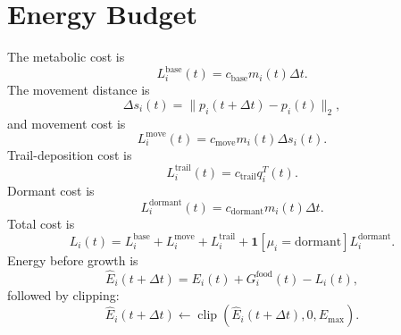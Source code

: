 \documentclass[11pt]{article}
\begin{document}
\section{Energy Budget}
The metabolic cost is
\begin{equation}
  L_i^{\mathrm{base}}(t)=c_{\mathrm{base}}m_i(t)\Delta t.
\end{equation}
The movement distance is
\begin{equation}
  \Delta s_i(t)=\|p_i(t+\Delta t)-p_i(t)\|_2,
\end{equation}
and movement cost is
\begin{equation}
  L_i^{\mathrm{move}}(t)=c_{\mathrm{move}}m_i(t)\Delta s_i(t).
\end{equation}
Trail-deposition cost is
\begin{equation}
  L_i^{\mathrm{trail}}(t)=c_{\mathrm{trail}}q_i^T(t).
\end{equation}
Dormant cost is
\begin{equation}
  L_i^{\mathrm{dormant}}(t)=c_{\mathrm{dormant}}m_i(t)\Delta t.
\end{equation}
Total cost is
\begin{equation}
  L_i(t)=L_i^{\mathrm{base}}+L_i^{\mathrm{move}}+
  L_i^{\mathrm{trail}}+\mathbf{1}[\mu_i=\mathrm{dormant}]L_i^{\mathrm{dormant}}.
\end{equation}
Energy before growth is
\begin{equation}
  \hat E_i(t+\Delta t)=
  E_i(t)+G_i^{\mathrm{food}}(t)-L_i(t),
\end{equation}
followed by clipping:
\begin{equation}
  \hat E_i(t+\Delta t)\leftarrow
  \operatorname{clip}\left(\hat E_i(t+\Delta t),0,E_{\max}\right).
\end{equation}
\end{document}
